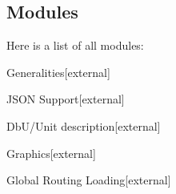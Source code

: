 \subsection{Modules}
Here is a list of all modules\-:\begin{DoxyCompactList}
\item {}
\item {}
\item Generalities{\ttfamily  \mbox{[}external\mbox{]}}\item J\-S\-O\-N Support{\ttfamily  \mbox{[}external\mbox{]}}\item Db\-U/\-Unit description{\ttfamily  \mbox{[}external\mbox{]}}\item Graphics{\ttfamily  \mbox{[}external\mbox{]}}\item Global Routing Loading{\ttfamily  \mbox{[}external\mbox{]}}\end{DoxyCompactList}
